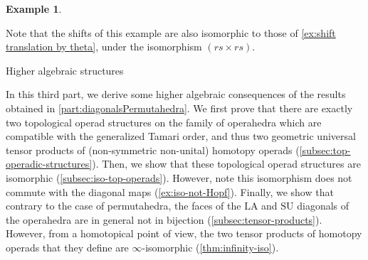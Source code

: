 \documentclass{amsart}
\makeatletter
\theoremstyle{definition}
\newtheorem{example}[theorem]{Example}
\newcommand{\SU}{\mathrm{SU}}
\newcommand{\LA}{\mathrm{LA}}
\def\part{\@startsection{part}{1}%
\z@{.7\linespacing\@plus\linespacing}{.8\linespacing}%
{\LARGE\sffamily\centering}}
\makeatother
\begin{document}
\begin{example}
\begin{center}
{
}
\end{center}
Note that the shifts of this example are also isomorphic to those of \cref{ex:shift translation by theta}, under the isomorphism  $(rs\times rs)$.
\end{example}


\clearpage

\part{Higher algebraic structures}
\label{part:higherAlgebraicStructures}

In this third part, we derive some higher algebraic consequences of the results obtained in \cref{part:diagonalsPermutahedra}.
We first prove that there are exactly two topological operad structures on the family of operahedra which are compatible with the generalized Tamari order, and thus two geometric universal tensor products of (non-symmetric non-unital) homotopy operads (\cref{subsec:top-operadic-structures}).
Then, we show that these topological operad structures are isomorphic (\cref{subsec:iso-top-operads}).
However, note this isomorphism does not commute with the diagonal maps (\cref{ex:iso-not-Hopf}).
Finally, we show that contrary to the case of permutahedra, the faces of the $\LA$ and $\SU$ diagonals of the operahedra are in general not in bijection (\cref{subsec:tensor-products}).
However, from a homotopical point of view, the two tensor products of homotopy operads that they define are $\infty$-isomorphic (\cref{thm:infinity-iso}). 

\end{document}
